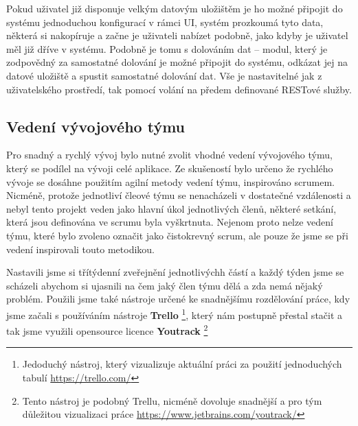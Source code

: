 \par Pokud uživatel již disponuje velkým datovým uložištěm je ho možné připojit do systému jednoduchou konfigurací v rámci UI, systém prozkoumá tyto data, některá si nakopíruje a začne je uživateli nabízet podobně, jako kdyby je uživatel měl již dříve v systému. Podobně je tomu s dolováním dat -- modul, který je zodpovědný za samostatné dolování je možné připojit do systému, odkázat jej na datové uložiště a spustit samostatné dolování dat. Vše je nastavitelné jak z uživatelského prostředí, tak pomocí volání na předem definované RESTové služby.

\subsection{Vedení vývojového týmu}
\par Pro snadný a rychlý vývoj bylo nutné zvolit vhodné vedení vývojového týmu, který se podílel na vývoji celé aplikace. Ze skušeností bylo určeno že rychlého vývoje se dosáhne použitím agilní metody vedení týmu, inspirováno scrumem. Nicméně, protože jednotliví čleové týmu se nenacházeli v dostatečné vzdálenosti a nebyl tento projekt veden jako hlavní úkol jednotlivých členů, některé setkání, která jsou definována ve scrumu byla vyškrtnuta. Nejenom proto nelze vedení týmu, které bylo zvoleno označit jako čistokrevný scrum, ale pouze že jsme se při vedení inspirovali touto metodikou.

\par Nastavili jsme si třítýdenní zveřejnění jednotlivýchh částí a každý týden jsme se scházeli abychom si ujasnili na čem jaký člen týmu dělá a zda nemá nějaký problém. Použili jsme také nástroje určené ke snadnějšímu rozdělování práce, kdy jsme začali s používáním nástroje \textbf{Trello} \footnote{Jedoduchý nástroj, který vizualizuje aktuální práci za použití jednoduchých tabulí \url{https://trello.com/}}, který nám postupně přestal stačit a tak jsme využili opensource licence \textbf{Youtrack} \footnote{Tento nástroj je podobný Trellu, nicméně dovoluje snadnější a pro tým důležitou vizualizaci práce \url{https://www.jetbrains.com/youtrack/}}


